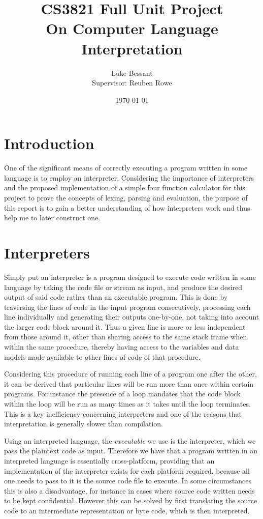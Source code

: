 \documentclass[a4paper, 11pt]{article}
\title{\textbf{CS3821 Full Unit Project}\\On Computer Language Interpretation}
\author{Luke Bessant\\Supervisor: Reuben Rowe}
\date{\today}
\begin{document}
\maketitle
\thispagestyle{title}
\newpage

\tableofcontents
\newpage

\section{Introduction}
One of the significant means of correctly executing a program written in some language is to employ an interpreter. Considering the importance of interpreters and the proposed implementation of a simple four function calculator for this project to prove the concepts of lexing, parsing and evaluation, the purpose of this report is to gain a better understanding of how interpreters work and thus help me to later construct one.

\section{Interpreters}
Simply put an interpreter is a program designed to execute code written in some language by taking the code file or stream as input, and produce the desired output of said code rather than an executable program. This is done by traversing the lines of code in the input program consecutively, processing each line individually and generating their outputs one-by-one, not taking into account the larger code block around it. Thus a given line is more or less independent from those around it, other than sharing access to the same stack frame when within the same procedure, thereby having access to the variables and data models made available to other lines of code of that procedure.

Considering this procedure of running each line of a program one after the other, it can be derived that particular lines will be run more than once within certain programs. For instance the presence of a loop mandates that the code block within the loop will be run as many times as it takes until the loop terminates. This is a key inefficiency concerning interpreters and one of the reasons that interpretation is generally slower than compilation.

Using an interpreted language, the \textit{executable} we use is the interpreter, which we pass the plaintext code as input. Therefore we have that a program written in an interpreted language is essentially cross-platform, providing that an implementation of the interpreter exists for each platform required, because all one needs to pass to it is the source code file to execute. In some circumstances this is also a disadvantage, for instance in cases where source code written needs to be kept confidential. However this can be solved by first translating the source code to an intermediate representation or byte code, which is then interpreted.
\end{document}
